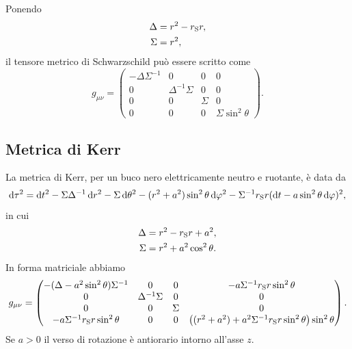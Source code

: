 Ponendo
\begin{subequations}
  \begin{align}
    \Delta             & = r^{2} - r_{\textup{S}}r, \\
    \Sigma             & = r^{2},
  \end{align}
\end{subequations}
il tensore metrico di Schwarzschild può essere scritto come
\begin{equation}
  g_{\mu\nu} =
  \begin{pmatrix}
    -\Delta\Sigma^{-1} & 0                 & 0      & 0 \\
    0                  & \Delta^{-1}\Sigma & 0      & 0 \\
    0                  & 0                 & \Sigma & 0 \\
    0                  & 0                 & 0      & \Sigma\sin^{2}\theta
  \end{pmatrix}.
\end{equation}

\subsection{Metrica di Kerr}
\label{sec:metrica-kerr}

La metrica di Kerr, per un buco nero elettricamente neutro e ruotante, è data
da
\begin{equation}
  \label{eq:metrica-kerr}
  \mathop{}\!\mathrm{d}\tau^{2} = \mathop{}\!\mathrm{d} t^{2} - \Sigma\Delta^{-1} \mathop{}\!\mathrm{d} r^{2} - \Sigma\mathop{}\!\mathrm{d}\theta^{2} -
  (r^{2} + a^{2})\sin^{2}\theta\mathop{}\!\mathrm{d}\varphi^{2} - \Sigma^{-1}r_{\textup{S}}r(\mathop{}\!\mathrm{d} t -
  a\sin^{2}\theta\mathop{}\!\mathrm{d}\varphi)^{2},
\end{equation}
in cui
\begin{subequations}
  \begin{align}
    \Delta &= r^{2} - r_{\textup{S}}r + a^{2}, \\
    \Sigma &= r^{2} + a^{2}\cos^{2}\theta.
  \end{align}
\end{subequations}
In forma matriciale abbiamo
\begin{equation}
  g_{\mu\nu} =
  \begin{pmatrix}
    -(\Delta - a^{2}\sin^{2}\theta)\Sigma^{-1} & 0 & 0 &
    -a\Sigma^{-1}r_{\textup{S}}r\sin^{2}\theta \\
    0 & \Delta^{-1}\Sigma & 0 & 0 \\
    0 & 0 & \Sigma & 0 \\
    -a\Sigma^{-1}r_{\textup{S}}r\sin^{2}\theta & 0 & 0 & \bigl((r^{2} + a^{2}) +
    a^{2}\Sigma^{-1}r_{\textup{S}}r\sin^{2}\theta\bigr)\sin^{2}\theta
  \end{pmatrix}.
\end{equation}
Se \(a > 0\) il verso di rotazione è antiorario intorno all'asse \(z\).

